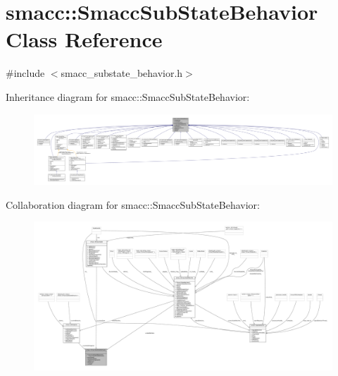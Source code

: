 \hypertarget{classsmacc_1_1SmaccSubStateBehavior}{}\section{smacc\+:\+:Smacc\+Sub\+State\+Behavior Class Reference}
\label{classsmacc_1_1SmaccSubStateBehavior}


{\ttfamily \#include $<$smacc\+\_\+substate\+\_\+behavior.\+h$>$}



Inheritance diagram for smacc\+:\+:Smacc\+Sub\+State\+Behavior\+:
\nopagebreak
\begin{figure}[H]
\begin{center}
\leavevmode
\includegraphics[width=350pt]{classsmacc_1_1SmaccSubStateBehavior__inherit__graph}
\end{center}
\end{figure}


Collaboration diagram for smacc\+:\+:Smacc\+Sub\+State\+Behavior\+:
\nopagebreak
\begin{figure}[H]
\begin{center}
\leavevmode
\includegraphics[width=350pt]{classsmacc_1_1SmaccSubStateBehavior__coll__graph}
\end{center}
\end{figure}
